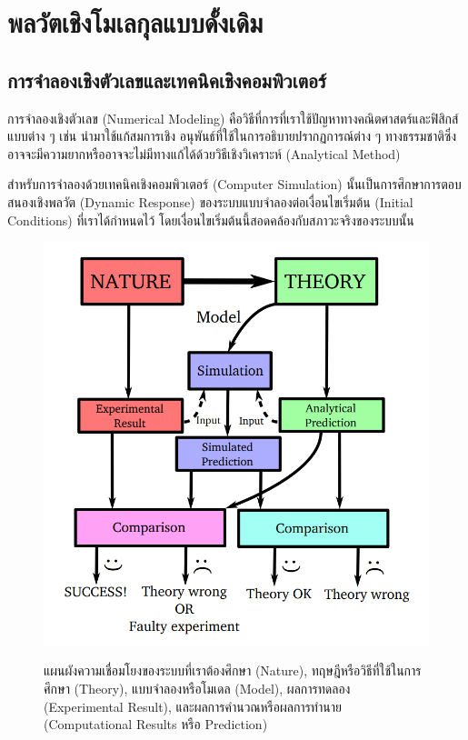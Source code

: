 

\chapter{พลวัตเชิงโมเลกุลแบบดั้งเดิม}
\label{ch:aimd}

\section{การจำลองเชิงตัวเลขและเทคนิคเชิงคอมพิวเตอร์}

การจำลองเชิงตัวเลข (Numerical Modeling) คือวิธีที่การที่เราใช้ปัญหาทางคณิตศาสตร์และฟิสิกส์แบบต่าง ๆ เช่น นำมาใช้แก้สมการเชิง%
อนุพันธ์ที่ใช้ในการอธิบายปรากฏการณ์ต่าง ๆ ทางธรรมชาติซึ่งอาจจะมีความยากหรืออาจจะไม่มีทางแก้ได้ด้วยวิธีเชิงวิเคราะห์ (Analytical Method)

สำหรับการจำลองด้วยเทคนิคเชิงคอมพิวเตอร์ (Computer Simulation) นั้นเป็นการศึกษาการตอบสนองเชิงพลวัต (Dynamic Response) 
ของระบบแบบจำลองต่อเงื่อนไขเริ่มต้น (Initial Conditions) ที่เราได้กำหนดไว้ โดยเงื่อนไขเริ่มต้นนี้สอดคล้องกับสภาวะจริงของระบบนั้น

\begin{figure}[htbp]
    \centering
    \includegraphics[width=0.8\linewidth]{fig/simulation-modeling-graph.png}
    \label{fig:sim_model_graph}
    \caption{แผนผังความเชื่อมโยงของระบบที่เราต้องศึกษา (Nature), ทฤษฎีหรือวิธีที่ใช้ในการศึกษา (Theory), แบบจำลองหรือโมเดล 
    (Model), ผลการทดลอง (Experimental Result), และผลการคำนวณหรือผลการทำนาย (Computational Results หรือ Prediction)}
\end{figure}

